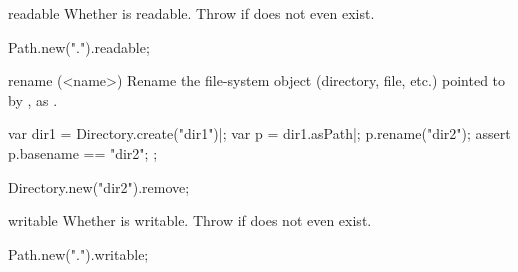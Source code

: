 \begin{urbiscriptapi}
\begin{urbiassert}
\end{urbiassert}


\item[readable]
  Whether \this is readable.  Throw if does not even exist.
\begin{urbiassert}
Path.new(".").readable;
\end{urbiassert}


\item[rename](<name>)%
  Rename the file-system object (directory, file, etc.) pointed to by \this,
  as .
\begin{urbiscript}
var dir1 = Directory.create("dir1")|;
var p = dir1.asPath|;
p.rename("dir2");
assert
{
  p.basename == "dir2";
};
\end{urbiscript}
\begin{urbicomment}
Directory.new("dir2").remove;
\end{urbicomment}


\item[writable]
  Whether \this is writable.  Throw if does not even exist.
\begin{urbiassert}
Path.new(".").writable;
\end{urbiassert}
\end{urbiscriptapi}


